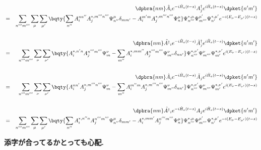 \documentclass[10.5pt,a4paper]{jreport}
\begin{document}
\begin{screen}
  \begin{eqnarray}
    \nonumber    &&\dpbra{nm}\hat{A}_ie^{-i\hat{H}_a(t-s)}A_j^\dagger e^{i\hat{H}_a(t-s)}\dpket{n'm'}\\
    \nonumber    &=&\sum_{n'''m'''}\sum_{\mu}\sum_{\mu'}\bqty{\sum_{n''}A_i^{nn''}A_j^{*, m'''n'''}\Psi_{n''}^{\mu}\delta_{mm'}- A_i^{m'm}A_j^{*, m'''n'''}\Psi_{n}^{\mu}}\Psi_{n'''}^{*, \mu}\Psi_{m'''}^{\mu'}\Psi_{n'}^{*, \mu'}e^{-i(E_\mu - E_{\mu'})(t-s)}\\\\
    \nonumber &&\dpbra{nm}\hat{A^\dagger}_ie^{-i\hat{H}_a(t-s)}\tilde{A}_j^\dagger e^{i\hat{H}_a(t-s)}\dpket{n'm'}\\
    \nonumber    &=&\sum_{n'''m'''}\sum_{\nu}\sum_{\nu'}\bqty{A_i^{*, n'n}A_j^{n'''m'''}\Psi_{m}^{\nu}- \sum_{m''}A_i^{*, mm''}A_j^{n'''m'''}\Psi_{m''}^{\nu}\delta_{nn'}}\Psi_{n'''}^{*, \nu'}\Psi_{m'''}^{\nu}\Psi_{m'}^{*, \nu'}e^{i(E_\nu- E_{\nu'})(t-s)}\\\\
    \nonumber&&\dpbra{nm}\hat{A}_ie^{-i\hat{H}_a(t-s)}\tilde{A}_j e^{i\hat{H}_a(t-s)}\dpket{n'm'}\\
    \nonumber    &=&\sum_{n'''m'''}\sum_{\nu}\sum_{\nu'}\bqty{A_i^{nn'}A_j^{*, m'''n'''}\Psi_{m}^{\nu}- \sum_{m''}A_i^{m''m}A_j^{*, m'''n'''}\Psi_{m''}^{\nu}\delta_{nn'} }\Psi_{n'''}^{*, \nu'}\Psi_{m'''}^{\nu}\Psi_{m'}^{*, \nu'}e^{i(E_\nu- E_{\nu'})(t-s)}\\\\
    \nonumber    &&\dpbra{nm}\hat{A^\dagger}_ie^{-i\hat{H}_a(t-s)}A_j e^{i\hat{H}_a(t-s)}\dpket{n'm'}\\
    \nonumber &=&\sum_{n'''m'''}\sum_{ {\mu}}\sum_{ {\mu'}}\bqty{\sum_{n''}A_i^{ {*, n''n}}A_j^{n'''m'''}\Psi_{n''}^{\mu}\delta_{mm'} - A_i^{*, mm'}A_j^{n'''m'''}\Psi_{n}^{\mu}}\Psi_{n'''}^{*, \mu}\Psi_{m'''}^{\mu'}\Psi_{n'}^{*, \mu'}e^{ {-i(E_\mu- E_{\mu'})(t-s)}}\\
  \end{eqnarray}
\end{screen}
\textbf{添字が合ってるかとっても心配.}
\end{document}
